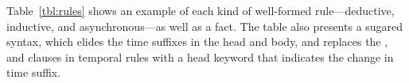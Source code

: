 Table~\ref{tbl:rules} shows an example of each kind of well-formed \lang
rule---deductive, inductive, and asynchronous---as well as a \lang fact.  The
table also presents a sugared syntax, which elides the time suffixes in the
head and body, and replaces the ,  and
 clauses in temporal rules with a head keyword that indicates
the change in time suffix.

%



